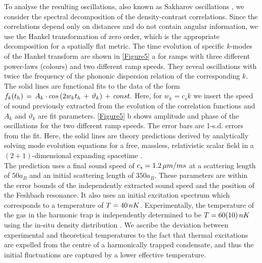 \documentclass[11pt,twocolumn,letterpaper]{article}
\newcounter{ns}
\begin{document}
To analyse the resulting oscillations, also known as Sakharov oscillations \cite{Lb.29, Lb.34, Lb.35}, we consider the spectral decomposition of the density-contrast correlations. Since the correlations depend only on distances and do not contain angular information, we use the Hankel transformation of zero order, which is the appropriate decomposition for a spatially flat metric. The time evolution of specific $k$-modes of the Hankel transform are shown in \ref{Figure5} a for ramps with three different power-laws (colours) and two different ramp speeds. They reveal oscillations with twice the frequency of the phononic dispersion relation of the corresponding $k$. The solid lines are functional fits to the data of the form $f_{k}(t_h) \thinspace = \thinspace A_{k} \cdot cos \left( 2w_{k} t_{h} \thinspace + \thinspace \vartheta_{k} \right) \thinspace + \thinspace const.$ Here, for $w_{k} = c_{s}k$ we insert the speed of sound previously extracted from the evolution of the correlation functions and $A_{k}$ and $\vartheta_{k}$ are fit parameters. \ref{Figure5} b shows amplitude and phase of the oscillations for the two different ramp speeds. The error bars are 1-s.d. errors from the fit. Here, the solid lines are theory predictions derived by analytically solving mode evolution equations for a free, massless, relativistic scalar field in a $(2 + 1)$-dimensional expanding spacetime \cite{Lb.32}.\\

The prediction uses a final sound speed of $c_{s} = 1.2 \thinspace \mu m/ ms$ at a scattering length of $50a_{B}$ and an initial scattering length of $350a_{B}$. These parameters are within the error bounds of the independently extracted sound speed and the position of the Feshbach resonance. It also uses an initial excitation spectrum which corresponds to a temperature of $T = 40 \thinspace nK$. Experimentally, the temperature of the gas in the harmonic trap is independently determined to be $T = 60(10) \thinspace nK$ using the in-situ density distribution \cite{Lb.36}. We ascribe the deviation between experimental and theoretical temperatures to the fact that thermal excitations are expelled from the centre of a harmonically trapped condensate, and thus the initial fluctuations are captured by a lower effective temperature.\\
\end{document}
